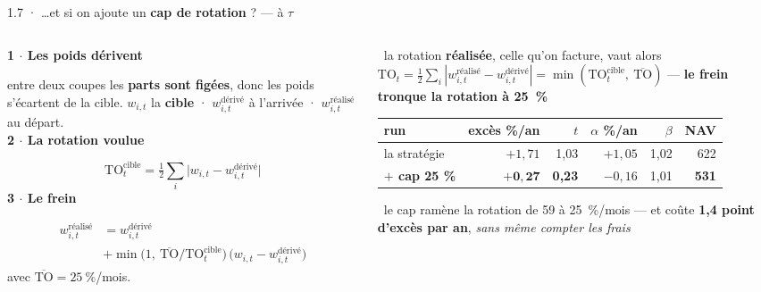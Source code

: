 \documentclass[11pt,aspectratio=169]{beamer}
\newcommand{\et}[2]{{\color{bleu}\bfseries #1 $\cdot$ #2}\par\vspace{0.6mm}}
\newcommand{\obs}[1]{{\color{bleu}\scriptsize\textbullet}~{\scriptsize #1}\par\vspace{0.4mm}}
\begin{document}
\begin{frame}{1.7 · \ldots et si on ajoute un \textbf{cap de rotation} ? --- à $\tau$}
  \begin{columns}[T]
    \begin{column}{0.49\textwidth}
      \et{1}{Les poids dérivent}
      {\scriptsize entre deux coupes les \textbf{parts sont figées}, donc les poids s'écartent de
       la cible. $w_{i,t}$ la \textbf{cible} · $w^{\text{dérivé}}_{i,t}$ à l'arrivée ·
       $w^{\text{réalisé}}_{i,t}$ au départ.}\\[1.5mm]
      \et{2}{La rotation voulue}
      \vspace{-1mm}
      {\footnotesize\[ \mathrm{TO}^{\text{cible}}_t = \tfrac12 \sum_i
                       \bigl| w_{i,t} - w^{\text{dérivé}}_{i,t} \bigr| \]}
      \vspace{-2mm}
      \et{3}{Le frein}
      \vspace{-1mm}
      {\footnotesize\begin{align*}
         w^{\text{réalisé}}_{i,t} &= w^{\text{dérivé}}_{i,t}\\[-0.5mm]
           &+ \min\bigl(1,\ \overline{\mathrm{TO}}/\mathrm{TO}^{\text{cible}}_t\bigr)\,
              \bigl(w_{i,t} - w^{\text{dérivé}}_{i,t}\bigr)
       \end{align*}}
      \vspace{-3mm}
      {\scriptsize avec $\overline{\mathrm{TO}} = 25~\%$/mois.}
    \end{column}
    \begin{column}{0.48\textwidth}
      \obs{la rotation \textbf{réalisée}, celle qu'on facture, vaut alors
       $\mathrm{TO}_t = \tfrac12\sum_i|w^{\text{réalisé}}_{i,t} - w^{\text{dérivé}}_{i,t}|
       = \min(\mathrm{TO}^{\text{cible}}_t,\ \overline{\mathrm{TO}})$ --- \textbf{le frein tronque
       la rotation à 25~\%}}
      \vspace{2.5mm}
      {\scriptsize\setlength{\tabcolsep}{3.4pt}
      \begin{tabular}{@{}l r r r r r@{}}
        \toprule
        run & excès \%/an & $t$ & $\alpha$ \%/an & $\beta$ & NAV\\
        \midrule
        la stratégie & $+1{,}71$ & 1,03 & $+1{,}05$ & 1,02 & 622\\
        \textbf{$+$ cap 25 \%} & $\mathbf{+0{,}27}$ & \textbf{0,23} & $-0{,}16$ & 1,01 & \textbf{531}\\
        \bottomrule
      \end{tabular}}\par\vspace{3mm}
      \obs{le cap ramène la rotation de 59 à 25~\%/mois --- et coûte \textbf{1,4 point d'excès par
       an}, \emph{sans même compter les frais}}
    \end{column}
  \end{columns}
\end{frame}
\end{document}
